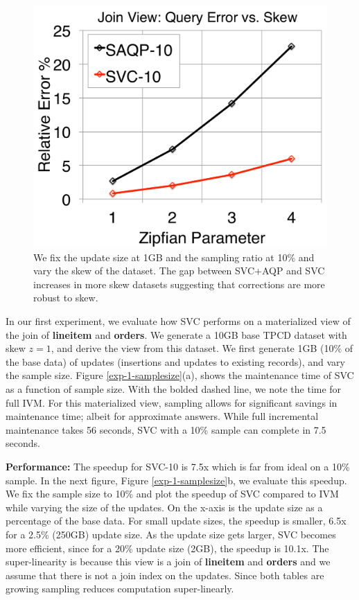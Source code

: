 \begin{figure}[t]
\centering
  \includegraphics[scale=0.25]{exp/msj_5.pdf}
 \caption{We fix the update size at 1GB and the sampling ratio at 10\% and vary the skew of the dataset. The gap between SVC+AQP and SVC increases in more skew datasets suggesting that corrections are more robust to skew. \label{exp-1-zipf}}
\end{figure}

In our first experiment, we evaluate how SVC performs on a materialized view of the join of \textbf{lineitem} and \textbf{orders}.
We generate a 10GB base TPCD dataset with skew $z=1$, and derive the view from this dataset.
We first generate 1GB (10\% of the base data) of updates (insertions and updates to existing records), and vary the sample size.
Figure \ref{exp-1-samplesize}(a), shows the maintenance time of SVC as a function of sample size.
With the bolded dashed line, we note the time for full IVM. 
For this materialized view, sampling allows for significant savings in maintenance time; albeit for approximate answers.
While full incremental maintenance takes 56 seconds, SVC with a 10\% sample can complete in 7.5 seconds.

\textbf{Performance: }
The speedup for SVC-10 is 7.5x which is far from ideal on a 10\% sample.
In the next figure, Figure \ref{exp-1-samplesize}b, we evaluate this speedup. 
We fix the sample size to 10\% and plot the speedup of SVC compared to IVM while varying the size of the updates.
On the x-axis is the update size as a percentage of the base data.
For small update sizes, the speedup is smaller, 6.5x for a 2.5\% (250GB) update size.
As the update size gets larger, SVC becomes more efficient, since for a 20\% update size (2GB), the speedup is 10.1x. 
The super-linearity is because this view is a join of \textbf{lineitem} and \textbf{orders} and we assume that there is not a join index on the updates.
Since both tables are growing sampling reduces computation super-linearly. 

